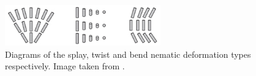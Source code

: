 \documentclass[12pt]{article}
\begin{document}
        \begin{figure}[t]
            \begin{center}
                \includegraphics[width=0.6\textwidth]{figures/nematic_deformations.jpg}
            \end{center}
            \caption{
                Diagrams of the splay, twist and bend nematic deformation types respectively.
                Image taken from \cite{suryantariImageFeatureExtraction2019}.
            }\label{fig:nem_deform}
        \end{figure}
\end{document}
